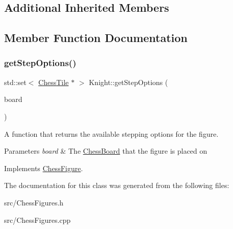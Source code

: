 \subsection*{Additional Inherited Members}


\subsection{Member Function Documentation}
\mbox{\label{classKnight_abb638cd75748653ec35365a77d528c42}} 
\subsubsection{\texorpdfstring{get\+Step\+Options()}{getStepOptions()}}
{\footnotesize\ttfamily std\+::set$<$ \mbox{\hyperlink{classChessTile}{Chess\+Tile}} $\ast$ $>$ Knight\+::get\+Step\+Options (\begin{DoxyParamCaption}\item[{\mbox{\hyperlink{classChessBoard}{Chess\+Board}} \&}]{board }\end{DoxyParamCaption})\hspace{0.3cm}{\ttfamily [virtual]}}



A function that returns the available stepping options for the figure. 


\begin{DoxyParams}{Parameters}
{\em board} & The \mbox{\hyperlink{classChessBoard}{Chess\+Board}} that the figure is placed on \\
\hline
\end{DoxyParams}


Implements \mbox{\hyperlink{classChessFigure_ae78d52e35c4ea926f492d211c69758bd}{Chess\+Figure}}.



The documentation for this class was generated from the following files\+:\begin{DoxyCompactItemize}
\item 
src/Chess\+Figures.\+h\item 
src/Chess\+Figures.\+cpp\end{DoxyCompactItemize}
